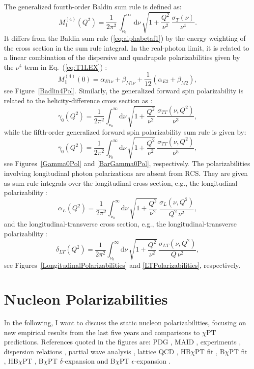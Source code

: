 \documentclass[preprints,review,accept,moreauthors,pdftex]{Definitions/mdpi}
\def\beq{\begin{equation}}
\def\eeq{\end{equation}}
\def\eqlab#1{\label{eq:#1}}
\def\eref#1{(\ref{eq:#1})}
\def\Eqref#1{Eq.~(\ref{eq:#1})}
\def\al{\alpha}
\def\dd{\mathrm{d}}
\begin{document}
The generalized fourth-order Baldin sum rule is defined as:
\beq
 M_1^{(4)}(Q^2)=
\frac{1}{2 \pi^2} \, \int_{\nu_0}^{\infty}\, \mathrm{d}\nu \,\sqrt{1+\frac{Q^2}{\nu^{2}}}\, \frac{\sigma_T(\nu)}{\nu^{4} }.
\eeq
It differs from the Baldin sum rule \eref{alphabetaf1} by the energy weighting of the cross section in the sum rule integral.
In the real-photon limit, it is related to a linear combination of the dispersive and quadrupole polarizabilities given by the $\nu^4$ term in \Eqref{T1LEX} \cite{Guiasu:1978dz,Holstein:1999uu}:
\beq
M_1^{(4)}(0)=\alpha_{E1 \nu} + \beta_{M1 \nu} + \frac{1}{12} (\alpha_{E2} + \beta_{M2}),
\eeq
see  Figure~\ref{Badlin4Pol}. Similarly, the generalized forward spin polarizability is related to the helicity-difference cross section as \cite{Drechsel:2002ar}: 
\beq
\eqlab{g0gen}
\gamma_0(Q^2)=\frac{1}{2 \pi^2} \int_{\nu_0}^\infty \! \dd\nu\,\sqrt{1+\frac{Q^2}{\nu^2}} \,\frac{\sigma_{TT} (\nu,Q^2)}{\nu^3},
\eeq
while the fifth-order generalized forward spin polarizability sum rule is given by: \beq
\bar\gamma_0 (Q^2)= \frac{1}{2 \pi^2} \int_{\nu_0}^\infty \! \dd\nu\,\sqrt{1+\frac{Q^2}{\nu^2}} \,\frac{\sigma_{TT} (\nu,Q^2)}{\nu^5},
\eeq
see Figures~\ref{Gamma0Pol} and \ref{BarGamma0Pol}, respectively.
The polarizabilities involving longitudinal photon polarizations are absent from RCS. They are given as sum rule integrals over the longitudinal cross section, e.g., the longitudinal polarizability \cite{Lensky:2014dda}:
\beq
\al_{L}(Q^2)=\frac{1}{2 \pi^2} \int_{\nu_0}^\infty\! \dd\nu\,\sqrt{1+\frac{Q^2}{\nu^{2}}}\,            \frac{\sigma_L (\nu,Q^2)}{Q^2\, \nu^{2}},
\eeq
and the longitudinal-transverse cross section, e.g., the longitudinal-transverse polarizability \cite{Drechsel:2002ar}:
\beq
\eqlab{dLTgen}
\delta_{LT}(Q^2)=\frac{1}{2 \pi^2} \int_{\nu_0}^\infty \! \dd\nu\,\sqrt{1+\frac{Q^2}{\nu^{2}}}\, \frac{\sigma_{LT} (\nu,Q^2)}{Q\,\nu^2},
\eeq
see Figures~\ref{LongitudinalPolarizabilities} and \ref{LTPolarizabilities}, respectively.



\section{Nucleon Polarizabilities}\label{results}

In the following, I want to discuss the static nucleon polarizabilities, focusing on new empirical results from the last five years and comparisons to $\chi$PT predictions.
References quoted in the figures are: PDG \cite{Zyla:2020}, MAID \cite{MAID}, experiments \cite{Paudyal:2019mee,Martel:2017pln,Sokhoyan:2016yrc,Martel:2014pba,Dutz:2003mm,Kossert:2002ws}, dispersion relations \cite{Schumacher:2019ikn, Pasquini:2019nnx,Pasquini:2017ehj,Gryniuk:2016gnm,Pasquini:2010zr,Holstein:1999uu,Babusci:1998ww,Schroder:1977sn}, partial wave analysis \cite{Krupina:2017pgr}, lattice QCD \cite{Bignell:2020xkf,Lujan:2016ffj,Hall:2013dva,Detmold:2010ts, Engelhardt:2007ub,Christensen:2004ca}, HB$\chi$PT fit \cite{Griesshammer:2015ahu,McGovern:2012ew,Griesshammer:2012we}, B$\chi$PT fit \cite{Lensky:2014efa}, HB$\chi$PT \cite{Bernard:1993ry,Knoechlein97,Nevado:2007dd}, B$\chi$PT $\delta$-expansion \cite{Lensky:2015awa,Alarcon:2020wjg,Alarcon:2020icz} and B$\chi$PT $\epsilon$-expansion \cite{Bernard:2012hb}.
\end{document}
